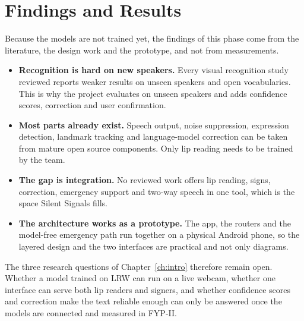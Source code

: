 \documentclass{FastFyp}
\begin{document}
\section{Findings and Results}
Because the models are not trained yet, the findings of this phase come from the literature, the design work and the prototype, and not from measurements.
\begin{itemize}
  \item \textbf{Recognition is hard on new speakers.} Every visual recognition study reviewed reports weaker results on unseen speakers and open vocabularies. This is why the project evaluates on unseen speakers and adds confidence scores, correction and user confirmation.
  \item \textbf{Most parts already exist.} Speech output, noise suppression, expression detection, landmark tracking and language-model correction can be taken from mature open source components. Only lip reading needs to be trained by the team.
  \item \textbf{The gap is integration.} No reviewed work offers lip reading, signs, correction, emergency support and two-way speech in one tool, which is the space Silent Signals fills.
  \item \textbf{The architecture works as a prototype.} The app, the routers and the model-free emergency path run together on a physical Android phone, so the layered design and the two interfaces are practical and not only diagrams.
\end{itemize}
The three research questions of Chapter~\ref{ch:intro} therefore remain open. Whether a model trained on LRW can run on a live webcam, whether one interface can serve both lip readers and signers, and whether confidence scores and correction make the text reliable enough can only be answered once the models are connected and measured in FYP-II.

\end{document}
